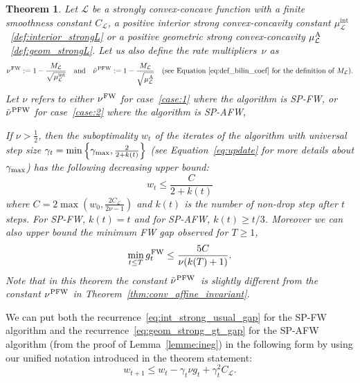 \documentclass[twoside]{article}
\renewcommand{\L}{\mathcal{L}}
\newcommand{\wt}{w_t}
\newcommand{\wtt}{w_{t+1}}
\newcommand{\gap}{g_{t}}
\newcommand{\CondNumb}{\nu}
\newtheorem{theorem}[definition]{Theorem}
\newcommand{\stepsize}{\gamma}
\newcommand{\stepmax}{\stepsize_{\textnormal{\scriptsize max}}} %
\newcommand{\FW}{{\hspace{0.05em}\textnormal{FW}}}
\newcommand{\PW}{{\hspace{0.05em}\textnormal{PFW}}}
\newcommand{\away}{{\hspace{0.05em}\textnormal{A}}}
\newcommand{\muIntL}{\mu^{\text{int}}_\L} %
\newcommand{\0}{\mathbf{0}} %
\begin{document}
   \begin{theorem}\label{thm:conv_sublin}
   Let $\L$ be a 
    strongly convex-concave function with a finite smoothness constant $C_\L$, a positive interior strong convex-concavity constant $\muIntL$~\eqref{def:interior_strongL} or a positive geometric strong convex-concavity $\mu^{\away}_\L$~\eqref{def:geom_strongL}. Let us also define the rate multipliers~$\CondNumb$ as
  \begin{equation}
    \CondNumb^{\FW} :=1- \frac{M_\L }{\sqrt{\muIntL}} \quad\text{and}\quad \tilde \CondNumb^{\PW} := 1- \frac{
        M_\L}{\sqrt{\mu^{\away}_\L}} \quad(\text{see Equation~\eqref{eq:def_bilin_coef} for the definition of } M_\L).
  \end{equation} 
    Let $\CondNumb$ refers to
  either $\CondNumb^{\FW}$ for case~\eqref{case:1} where the algorithm is SP-FW, or $\tilde\CondNumb^{\PW}$ for case~\eqref{case:2} where the algorithm is SP-AFW,

  If $\CondNumb>\frac{1}{2}$, then the suboptimality $w_t$ of the iterates of the algorithm with universal step size $\stepsize_t = \min\left\{\stepmax,\frac{2}{2+k(t)}\right\}$ (see Equation~\eqref{eq:update} for more details about $\stepmax$) has the following decreasing upper bound:
        \begin{equation}\label{eq:sub_rate_w}
          w_t \leq \frac{C}{{2+k(t)}}
        \end{equation}
      where $C = 2 \max\left(w_0,\frac{2 C_\L}{2 \CondNumb-1}\right)$ and $k(t)$ is the number of non-drop step after $t$ steps. For SP-FW, $k(t)=t$ and for SP-AFW, $k(t)\geq t/3$. 
      Moreover we can also upper bound the minimum FW gap observed for $T\geq 1$,
  \begin{equation}
    \min_{t \leq T} \gap^\FW \leq \frac{5C}{\CondNumb{}(k(T)+1)}.
  \end{equation}
    Note that in this theorem the constant $\tilde \CondNumb^{\PW}$ is slightly different from the constant $\CondNumb^{\PW}$ in Theorem~\ref{thm:conv_affine_invariant}.
  \end{theorem}
  \proof
    We can put both the recurrence~\eqref{eq:int_strong_usual_gap} for the SP-FW algorithm and the recurrence~\eqref{eq:geom_strong_gt_gap} for the SP-AFW algorithm (from the proof of Lemma~\ref{lemme:ineg}) in the following form by using our unified notation introduced in the theorem statement:
          \begin{equation}\label{eq:proof_sublinear2}
         \wtt 
       \leq \wt  
      - \stepsize_t \CondNumb \gap
      + \stepsize_t^2 {C_\L}. 
      \end{equation}
\end{document}
